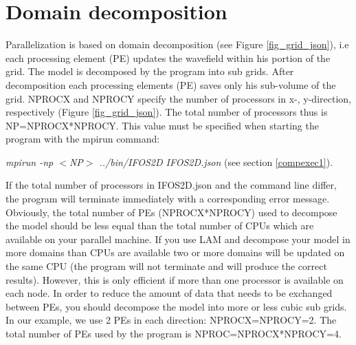 \section{Domain decomposition}
{\color{blue}{\begin{verbatim}
"Domain Decomposition" : "comment",
			"NPROCX" : "4",
			"NPROCY" : "2",
\end{verbatim}}}
Parallelization is based on domain decomposition (see Figure \ref{fig_grid_json}), i.e each processing element (PE) updates the wavefield within his portion of the grid. The model is  decomposed
by the program into sub grids. After decomposition each processing elements (PE) saves only his sub-volume of the grid. NPROCX and NPROCY specify the number of
processors in x-, y-direction, respectively (Figure  \ref{fig_grid_json}). The total number of processors thus is NP=NPROCX*NPROCY. This value must be specified when starting the program with the mpirun command:
\newline

\textit{mpirun -np $<$NP$>$ ../bin/IFOS2D IFOS2D.json} (see section \ref{compexec1}).
\newline

If the total number of processors in IFOS2D.json and the command line differ, the program will terminate immediately with a corresponding error message. Obviously, the total number of PEs (NPROCX*NPROCY) used to decompose the model  should be less equal than the total number of CPUs which are available on your parallel machine. If you use LAM and decompose your model in more domains than CPUs are available two or more  domains will be updated on the same CPU (the program will not terminate and will produce the correct results). However, this is only efficient if more than one processor is available on each node. In order to reduce the amount of data that needs to be  exchanged between PEs, you should decompose the model into more or less cubic sub grids. In our example, we use 2 PEs in each direction: NPROCX=NPROCY=2. The total number of PEs used by the program is NPROC=NPROCX*NPROCY=4. 

